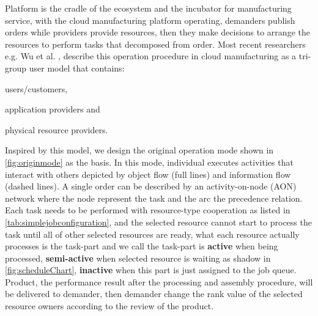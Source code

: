 Platform is the cradle of the ecosystem and the incubator for manufacturing service, with the cloud manufacturing platform operating, demanders publish orders while providers provide resources, then they make decisions to  arrange the resources to perform tasks that decomposed from order. Most recent researchers e.g. Wu et al. \cite{Wu2013}, describe this operation procedure in cloud manufacturing as a tri-group user model that contains:\begin{inparaenum}[1)]
\item users/customers,
\item application providers and
\item physical resource providers.
\end{inparaenum}
Inspired by this model, we design the original operation mode shown in \autoref{fig:originmode} as the basis.
In this mode, individual executes activities that interact with others depicted by object flow (full lines) and information flow (dashed lines). A single order can be described by an activity-on-node (AON) network where the node represent the task and the arc the precedence relation. Each task needs to be performed with resource-type cooperation as listed in \autoref{tab:simplejobconfiguration}, and the selected resource cannot start to process the task until all of other selected resources are ready, what each resource actually processes is the task-part and we call the task-part is \textbf{active} when being processed, \textbf{semi-active} when selected resource is waiting as shadow in \autoref{fig:scheduleChart}, \textbf{inactive} when this part is just assigned to the job queue. Product, the performance result after the processing and assembly procedure, will be delivered to demander, then demander change the rank value of the selected resource owners according to the review of the product. 


